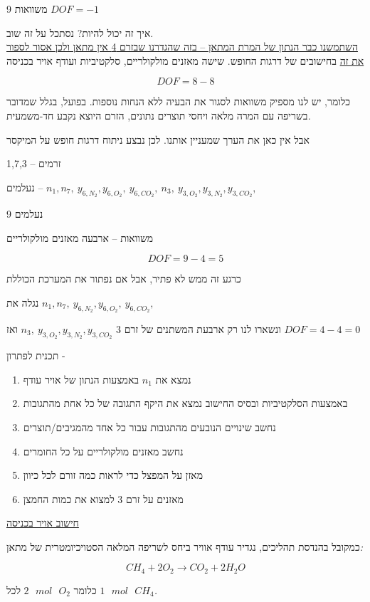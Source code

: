 \documentclass[
  hebrew,
  letterpaper,
  DIV=11,
  numbers=noendperiod]{scrreprt}
\begin{document}
9 משוואות \(DOF = - 1\)

איך זה יכול להיות? נסתכל על זה שוב.\\
\ul{השתמשנו כבר הנתון של המרת המתאן -- בזה שהגדרנו שבזרם 4 אין מתאן ולכן
אסור לספור את זה} בחישובים של דרגות החופש. שישה מאזנים מולקולריים,
סלקטיביות ועודף אויר בכניסה

\[DOF = 8 - 8\]

כלומר, יש לנו מספיק משוואות לסגור את הבעיה ללא הנחות נוספות. בפועל, בגלל
שמדובר בשריפה עם המרה מלאה ויחסי תוצרים נתונים, הזרם היוצא נקבע
חד-משמעית\emph{.}

אבל אין כאן את הערך שמעניין אותנו. לכן נבצע ניתוח דרגות חופש על המיקסר

זרמים -- 1,7,3

נעלמים --
\(n_{1},n_{7},\ y_{6,N_{2}},y_{6,O_{2}},\ y_{6,{CO}_{2}},\ n_{3},\ y_{3,O_{2}},y_{3,N_{2}},y_{3,CO_{2}},\ \)

9 נעלמים

משוואות -- ארבעה מאזנים מולקולריים

\[DOF = 9 - 4 = 5\]

כרגע זה ממש לא פתיר, אבל אם נפתור את המערכת הכוללת

נגלה את \(n_{1},n_{7},\ y_{6,N_{2}},y_{6,O_{2}},\ y_{6,{CO}_{2}},\)

ונשארו לנו רק ארבעת המשתנים של זרם 3
\(n_{3},\ y_{3,O_{2}},y_{3,N_{2}},y_{3,CO_{2}}\) ואז \(DOF = 4 - 4 = 0\)

תכנית לפתרון -

\begin{enumerate}
\def\labelenumi{\arabic{enumi}.}
\item
  נמצא את \(n_{1}\) באמצעות הנתון של אויר עודף
\item
  באמצעות הסלקטיביות ובסיס החישוב נמצא את היקף התגובה של כל אחת מהתגובות
\item
  נחשב שינויים הנובעים מהתגובות עבור כל אחד מהמגיבים/תוצרים
\item
  נחשב מאזנים מולקולריים על כל החומרים
\item
  מאזן על המפצל כדי לראות כמה זורם לכל כיוון
\item
  מאזנים על זרם 3 למצוא את כמות החמצן
\end{enumerate}

\ul{חישוב אויר בכניסה}

כמקובל בהנדסת תהליכים, נגדיר עודף אוויר ביחס לשריפה המלאה הסטויכיומטרית
של מתאן\emph{:}

\[CH_{4} + 2O_{2} \rightarrow CO_{2} + 2H_{2}O\]

כלומר \(2\text{ }mol\text{ }O_{2}\) לכל
\(1\text{ }mol\text{ }CH_{4}\)\emph{.}
\end{document}
